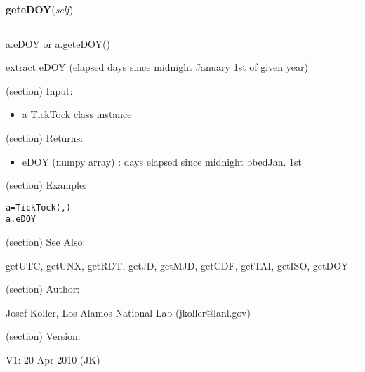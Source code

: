     \label{spacepy:spacetime:TickTock:geteDOY}

    \vspace{0.5ex}

\hspace{.8\funcindent}\begin{boxedminipage}{\funcwidth}

    \raggedright \textbf{geteDOY}(\textit{self})

    \vspace{-1.5ex}

    \rule{\textwidth}{0.5\fboxrule}
\setlength{\parskip}{2ex}
    a.eDOY or a.geteDOY()

    extract eDOY (elapsed days since midnight January 1st of given year)

    (section) Input:

      \begin{itemize}
      \setlength{\parskip}{0.6ex}
        \item a TickTock class instance

      \end{itemize}

    (section) Returns:

      \begin{itemize}
      \setlength{\parskip}{0.6ex}
        \item eDOY (numpy array) : days elapsed since midnight bbedJan. 1st

      \end{itemize}

    (section) Example:

\begin{alltt}
\pysrcprompt{{\textgreater}{\textgreater}{\textgreater} }a = TickTock(, )
\pysrcprompt{{\textgreater}{\textgreater}{\textgreater} }a.eDOY
\end{alltt}
    (section) See Also:

      getUTC, getUNX, getRDT, getJD, getMJD, getCDF, getTAI, getISO, getDOY

    (section) Author:

      Josef Koller, Los Alamos National Lab (jkoller@lanl.gov)

    (section) Version:

      V1: 20-Apr-2010 (JK)

\setlength{\parskip}{1ex}
    \end{boxedminipage}

